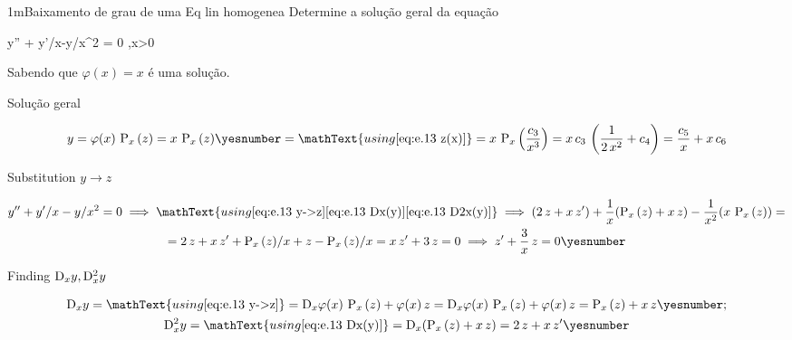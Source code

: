 \documentclass["AM3C-Slides_annotations.tex"]{subfiles}
\begin{document}
\begin{exampleBox}1m{Baixamento de grau de uma Eq lin homogenea} %
  Determine a solução geral da equação
  \begin{BM}
    y'' + y'/x-y/x^2 = 0
    ,\quad x>0
  \end{BM}
  Sabendo que \(\varphi(x) = x\) é uma solução.
  
  \answer{}

  Solução geral
  \begin{tcolorbox}
    \begin{gather*}
      y
      = \varphi(x)\,\prim_x{(z)}
      = x\,\prim_x{(z)}
      \yesnumber\label{eq:e.13 y->z}
      = \mathText{using \eqref{eq:e.13 z(x)}}
      = x\,\prim_x{\left(
          \frac{c_3}{x^3} 
      \right)}
      = x\,c_3\,\left(\frac{1}{2\,x^2}+c_4\right)
      = \frac{c_5}{x}+x\,c_6
    \end{gather*}
  \end{tcolorbox}
  
  Substitution \(y \to z\)
  \begin{tcolorbox}
    \begin{gather*}
      y'' + y'/x-y/x^2 = 0
      \implies \mathText{using
        \eqref{eq:e.13 y->z}
        \eqref{eq:e.13 Dx(y)}
        \eqref{eq:e.13 D2x(y)}
      }
      \implies
      (
        2\,z + x\,z'
      )
      + \frac{1}{x}(
        \prim_x{(z)} + x\,z
      )
      - \frac{1}{x^2}(
        x\,\prim_x{(z)} 
      )
      = \\
      = 2\,z 
      + x\,z'
      + \prim_x{(z)}/x
      + z
      - \prim_x{(z)}/x
      = x\,z' + 3\,z 
      = 0
      \implies
      z' + \frac{3}{x}\,z = 0
      \yesnumber\label{eq:e.13 eq z}
    \end{gather*}
  \end{tcolorbox}
  
  Finding \(\mdif[1]{x}{y},\mdif[2]{x}{y}\)
  \begin{tcolorbox}
    \begin{gather*}
      \mdif{x}{y}
      = \mathText{using \eqref{eq:e.13 y->z}}
      = \mdif{x}{\varphi(x)}
      \,\prim_x{(z)}
      + \varphi(x)\,z
      = \mdif{x}{\varphi(x)}
      \,\prim_x{(z)}
      + \varphi(x)\,z
      = 
      \prim_x{(z)} + x\,z
      \yesnumber\label{eq:e.13 Dx(y)}
      ;\\
      \mdif[2]{x}{y}
      = \mathText{using \eqref{eq:e.13 Dx(y)}}
      = \mdif{x}{(\prim_x{(z)} + x\,z)}
      = 
      2\,z + x\,z'
      \yesnumber\label{eq:e.13 D2x(y)}
    \end{gather*}
  \end{tcolorbox}


\end{exampleBox}
\end{document}
